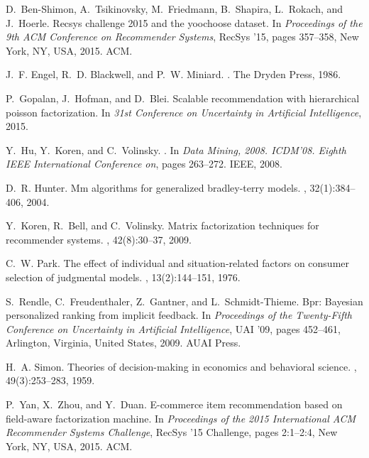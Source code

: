 \documentclass[sigconf]{acmart}
\begin{document}
\begin{thebibliography}{10}

D.~Ben-Shimon, A.~Tsikinovsky, M.~Friedmann, B.~Shapira, L.~Rokach, and
  J.~Hoerle.
\newblock Recsys challenge 2015 and the yoochoose dataset.
\newblock In {\em Proceedings of the 9th ACM Conference on Recommender
  Systems}, RecSys '15, pages 357--358, New York, NY, USA, 2015. ACM.

J.~F. Engel, R.~D. Blackwell, and P.~W. Miniard.
.
\newblock The Dryden Press, 1986.

P.~Gopalan, J.~Hofman, and D.~Blei.
\newblock Scalable recommendation with hierarchical poisson factorization.
\newblock In {\em 31st Conference on Uncertainty in Artificial Intelligence},
  2015.

Y.~Hu, Y.~Koren, and C.~Volinsky.
.
\newblock In {\em Data Mining, 2008. ICDM'08. Eighth IEEE International
  Conference on}, pages 263--272. IEEE, 2008.

D.~R. Hunter.
\newblock Mm algorithms for generalized bradley-terry models.
, 32(1):384--406, 2004.

Y.~Koren, R.~Bell, and C.~Volinsky.
\newblock Matrix factorization techniques for recommender systems.
, 42(8):30--37, 2009.

C.~W. Park.
\newblock The effect of individual and situation-related factors on consumer
  selection of judgmental models.
, 13(2):144--151, 1976.

S.~Rendle, C.~Freudenthaler, Z.~Gantner, and L.~Schmidt-Thieme.
\newblock Bpr: Bayesian personalized ranking from implicit feedback.
\newblock In {\em Proceedings of the Twenty-Fifth Conference on Uncertainty in
  Artificial Intelligence}, UAI '09, pages 452--461, Arlington, Virginia,
  United States, 2009. AUAI Press.

H.~A. Simon.
\newblock Theories of decision-making in economics and behavioral science.
, 49(3):253--283, 1959.

P.~Yan, X.~Zhou, and Y.~Duan.
\newblock E-commerce item recommendation based on field-aware factorization
  machine.
\newblock In {\em Proceedings of the 2015 International ACM Recommender Systems
  Challenge}, RecSys '15 Challenge, pages 2:1--2:4, New York, NY, USA, 2015.
  ACM.

\end{thebibliography}
\end{document}
